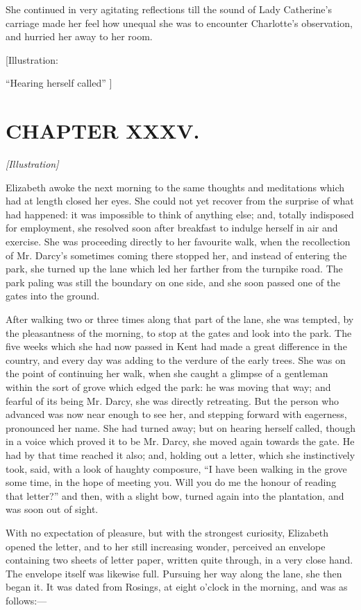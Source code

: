 \documentclass[12pt]{book}
\begin{document}
She continued in very agitating reflections till the sound of Lady Catherine's carriage made her feel how unequal she was to encounter Charlotte's observation, and hurried her away to her room.

[Illustration:

``Hearing herself called'' ]

\chapter{CHAPTER XXXV.}

\emph{[Illustration]}

Elizabeth awoke the next morning to the same thoughts and meditations which had at length closed her eyes. She could not yet recover from the surprise of what had happened: it was impossible to think of anything else; and, totally indisposed for employment, she resolved soon after breakfast to indulge herself in air and exercise. She was proceeding directly to her favourite walk, when the recollection of Mr. Darcy's sometimes coming there stopped her, and instead of entering the park, she turned up the lane which led her farther from the turnpike road. The park paling was still the boundary on one side, and she soon passed one of the gates into the ground.

After walking two or three times along that part of the lane, she was tempted, by the pleasantness of the morning, to stop at the gates and look into the park. The five weeks which she had now passed in Kent had made a great difference in the country, and every day was adding to the verdure of the early trees. She was on the point of continuing her walk, when she caught a glimpse of a gentleman within the sort of grove which edged the park: he was moving that way; and fearful of its being Mr. Darcy, she was directly retreating. But the person who advanced was now near enough to see her, and stepping forward with eagerness, pronounced her name. She had turned away; but on hearing herself called, though in a voice which proved it to be Mr. Darcy, she moved again towards the gate. He had by that time reached it also; and, holding out a letter, which she instinctively took, said, with a look of haughty composure, ``I have been walking in the grove some time, in the hope of meeting you. Will you do me the honour of reading that letter?'' and then, with a slight bow, turned again into the plantation, and was soon out of sight.

With no expectation of pleasure, but with the strongest curiosity, Elizabeth opened the letter, and to her still increasing wonder, perceived an envelope containing two sheets of letter paper, written quite through, in a very close hand. The envelope itself was likewise full. Pursuing her way along the lane, she then began it. It was dated from Rosings, at eight o'clock in the morning, and was as follows:---
\end{document}
